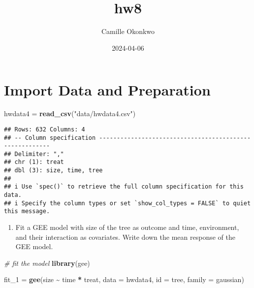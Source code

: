 \documentclass[
]{article}
\title{hw8}
\author{Camille Okonkwo}
\date{2024-04-06}
\newenvironment{Shaded}{\begin{snugshade}}{\end{snugshade}}
\newcommand{\AttributeTok}[1]{\textcolor[rgb]{0.13,0.29,0.53}{#1}}
\newcommand{\CommentTok}[1]{\textcolor[rgb]{0.56,0.35,0.01}{\textit{#1}}}
\newcommand{\FunctionTok}[1]{\textcolor[rgb]{0.13,0.29,0.53}{\textbf{#1}}}
\newcommand{\NormalTok}[1]{#1}
\newcommand{\OtherTok}[1]{\textcolor[rgb]{0.56,0.35,0.01}{#1}}
\newcommand{\SpecialCharTok}[1]{\textcolor[rgb]{0.81,0.36,0.00}{\textbf{#1}}}
\newcommand{\StringTok}[1]{\textcolor[rgb]{0.31,0.60,0.02}{#1}}
\providecommand{\tightlist}{%
  \setlength{\itemsep}{0pt}\setlength{\parskip}{0pt}}
\begin{document}
\maketitle

\hypertarget{import-data-and-preparation}{%
\section{Import Data and
Preparation}\label{import-data-and-preparation}}

\begin{Shaded}
\begin{Highlighting}[]
\NormalTok{hwdata4 }\OtherTok{=} \FunctionTok{read\_csv}\NormalTok{(}\StringTok{"data/hwdata4.csv"}\NormalTok{)}
\end{Highlighting}
\end{Shaded}

\begin{verbatim}
## Rows: 632 Columns: 4
## -- Column specification --------------------------------------------------------
## Delimiter: ","
## chr (1): treat
## dbl (3): size, time, tree
## 
## i Use `spec()` to retrieve the full column specification for this data.
## i Specify the column types or set `show_col_types = FALSE` to quiet this message.
\end{verbatim}

\begin{Shaded}
\end{Shaded}

\begin{enumerate}
\def\labelenumi{\arabic{enumi}.}
\tightlist
\item
  Fit a GEE model with size of the tree as outcome and time,
  environment, and their interaction as covariates. Write down the mean
  response of the GEE model.
\end{enumerate}

\begin{Shaded}
\begin{Highlighting}[]
\CommentTok{\# fit the model}
\FunctionTok{library}\NormalTok{(gee)}

\NormalTok{fit\_1 }\OtherTok{=} 
  \FunctionTok{gee}\NormalTok{(size }\SpecialCharTok{\textasciitilde{}}\NormalTok{ time }\SpecialCharTok{*}\NormalTok{ treat, }
      \AttributeTok{data =}\NormalTok{ hwdata4, }
      \AttributeTok{id =}\NormalTok{ tree, }
      \AttributeTok{family =}\NormalTok{ gaussian)}
\end{Highlighting}
\end{Shaded}
\end{document}
